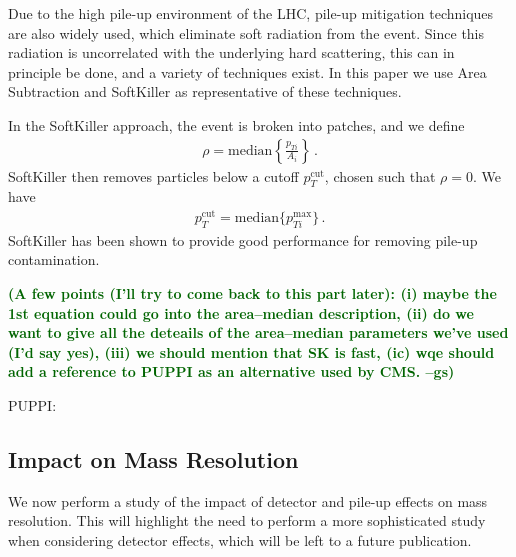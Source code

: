 \documentclass[11pt,letterpaper]{article}
\newcommand{\gs}[1]{\textbf{\textcolor{darkgreen}{(#1 --gs)}}}
\begin{document}
Due to the high pile-up environment of the LHC, pile-up mitigation techniques \cite{Cacciari:2007fd,Alon:2011xb,Soyez:2012hv,Tseng:2013dva,Krohn:2013lba,Cacciari:2014gra,Bertolini:2014bba} are also widely used, which eliminate soft radiation from the event.
%
Since this radiation is uncorrelated with the underlying hard scattering, this can in principle be done, and a variety of techniques exist.
%
In this paper we use Area Subtraction \cite{Cacciari:2007fd,Cacciari:2008gn} and SoftKiller \cite{Cacciari:2014gra} as representative of these techniques.

In the SoftKiller approach, the event is broken into patches, and we define
\begin{align}
\rho= \text{median} \left \{ \frac{p_{Ti}}{A_i}   \right \}\,.
\end{align}
SoftKiller then removes particles below a cutoff $p_T^{\text{cut}}$, chosen such that $\rho=0$. We have
\begin{align}
p_T^{\text{cut}}=\text{median} \{ p_{Ti}^{\text{max}} \}\,.
\end{align}
SoftKiller has been shown to provide good performance for removing pile-up contamination.

\gs{A few points (I'll try to come back to
  this part later): (i) maybe the 1st equation could go into the
  area--median description, (ii) do we want to give all the deteails
  of the area--median parameters we've used (I'd say yes), (iii) we
  should mention that SK is fast, (ic) wqe should add a reference to
  PUPPI as an alternative used by CMS.}

PUPPI: \cite{Bertolini:2014bba}

\subsection{Impact on Mass Resolution}\label{jetsub_2prong_sec:detector_robust}

We now perform a study of the impact of detector and pile-up effects on mass resolution.
%
This will highlight the need to perform a more sophisticated study when considering detector effects, which will be left to a future publication.
\end{document}
